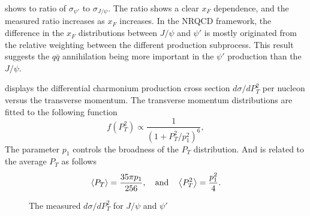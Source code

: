 \documentclass[reprint,aps,unsortedaddress,superscriptaddress,prd,floatfix,showpacs,linenumbers]{revtex4-2}
\begin{document}
 shows to ratio of $\sigma_{\psi'}$ to $\sigma_{J/\psi}$.
The ratio shows a clear $x_F$ dependence, and the measured ratio increases as $x_F$ increases.
In the NRQCD framework, the difference in the $x_F$ distributions between $J/\psi$ and $\psi'$
is mostly originated from the relative weighting between the different production subprocess.
This result suggests the $q\bar{q}$ annihilation being more important in the $\psi'$ production
than the $J/\psi$.

 displays the differential charmonium production cross section $d\sigma/d P_T^2$
per nucleon versus the transverse momentum. The transverse momentum distributions are fitted to the
following function\cite{kaplan1978}
\begin{equation}
	f\left(P_T^2\right) \propto \frac{1}{\left(1+ P_T^2/p_1^2\right)^6},
	\label{eq:kaplan}
\end{equation}
The parameter $p_1$ controls the broadness of the $P_T$ distribution. And is
related to the average $P_T$ as follows
\begin{equation}
	\expval{P_T}    = \frac{35\pi p_1}{256}, \quad \mathrm{and}\quad
	\expval{P_T^2}  = \frac{p_1^2}{4}.
\end{equation}
\begin{figure}[h]
	\caption{The measured $d\sigma/d P_T^2$ for $J/\psi$ and $\psi'$}
	\label{fig:pT_cross_sections}
\end{figure}
\end{document}
